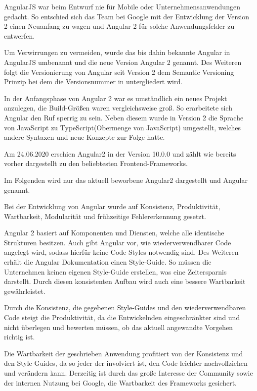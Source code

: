 AngularJS war beim Entwurf nie für Mobile oder Unternehmensanwendungen gedacht.
So entschied sich das Team bei Google mit der Entwicklung der Version 2 einen Neuanfang zu wagen und Angular 2 für solche Anwendungsfelder zu entwerfen.

Um Verwirrungen zu vermeiden, wurde das bis dahin bekannte Angular in AngularJS umbenannt und die neue Version Angular 2 genannt. Des Weiteren folgt die Versionierung von Angular seit Version 2 dem Semantic Versioning Prinzip bei dem die Versionsnummer in  untergliedert wird. 

In der Anfangsphase von Angular 2 war es umständlich ein neues Projekt anzulegen, die Build-Größen waren vergleichsweise groß. So erarbeitete sich Angular den Ruf sperrig zu sein.
Neben diesem wurde in Version 2 die Sprache von JavaScript zu TypeScript(Obermenge von JavaScript) umgestellt, welches andere Syntaxen und neue Konzepte zur Folge hatte. \cite{gaviganHistoryAngular2018}

Am 24.06.2020 erschien Angular2 in der Version 10.0.0 \cite{googleAngularAngularVersioning2020} und zählt wie bereits vorher dargestellt zu den beliebtesten Frontend-Frameworks.

Im Folgenden wird nur das aktuell beworbene Angular2 dargestellt und Angular genannt.

Bei der Entwicklung von Angular wurde auf Konsistenz, Produktivität, Wartbarkeit, Modularität und frühzeitige Fehlererkennung gesetzt.

Angular 2 basiert auf Komponenten und Diensten, welche alle identische Strukturen besitzen. Auch gibt Angular vor, wie wiederverwendbarer Code angelegt wird, sodass hierfür keine Code Styles notwendig sind. Des Weiteren erhält die Angular Dokumentation einen Style-Guide. So müssen die Unternehmen keinen eigenen Style-Guide erstellen, was eine Zeitersparnis darstellt.
Durch diesen konsistenten Aufbau wird auch eine bessere Wartbarkeit gewährleistet.

Durch die Konsistenz, die gegebenen Style-Guides und den wiederverwendbaren Code steigt die Produktivität, da die Entwickelnden eingeschränkter sind und nicht überlegen und bewerten müssen, ob das aktuell angewandte Vorgehen richtig ist. 

Die Wartbarkeit der geschrieben Anwendung profitiert von der Konsistenz und den Style Guides, da so jeder der involviert ist, den Code leichter nachvollziehen und verändern kann. Derzeitig ist durch das große Interesse der Community sowie der internen Nutzung bei Google, die Wartbarkeit des Frameworks gesichert.

